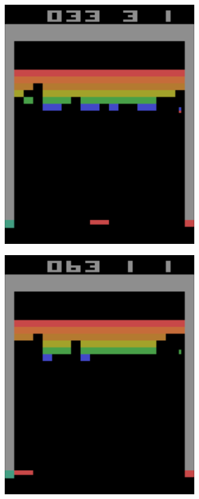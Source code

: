 \begin{figure}[h]
\begin{subfigure}[h]{0.3\linewidth}
\includegraphics[width=\linewidth]{images/atari-sequence-1.png}
\end{subfigure}
\hfill
\begin{subfigure}[h]{0.3\linewidth}
\includegraphics[width=\linewidth]{images/atari-sequence-2.png}

\end{subfigure}
\end{figure}
